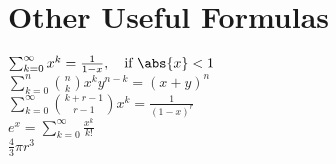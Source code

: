\section{Other Useful Formulas}
\(\sum_{k=0}^\infty x^k = \frac{1}{1-x}, \quad \text{if}\ \abs{x} < 1\)\\
\(\sum_{k=0}^n \binom{n}{k} x^k y^{n-k} = (x+y)^n\)\\
\(\sum_{k=0}^\infty \binom{k+r-1}{r-1} x^k = \frac{1}{(1-x)^r}\)\\
\(e^x = \sum_{k=0}^\infty \frac{x^k}{k!}\)\\
\(\frac{4}{3}\pi r^3\)
